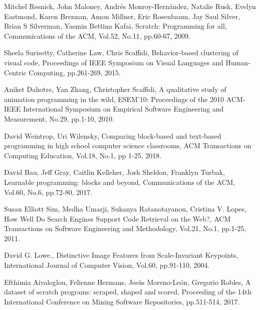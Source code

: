 \documentclass[11pt]{jreport}
\begin{document}

\begin{thebibliography}{99}

Mitchel Resnick, John Maloney, Andr\'{e}s Monroy-Hern\'{a}ndez, Natalie Rusk, Evelyn Eastmond, Karen Brennan, 
Amon Millner, Eric Rosenbaum, Jay Saul Silver, Brian S Silverman, Yasmin Bettina Kafai,
Scratch: Programming for all,
Communications of the ACM, Vol.52, No.11, pp.60-67, 2009.

Sheela Surisetty, Catherine Law, Chris Scaffidi, 
Behavior-based clustering of visual code,
Proceedings of IEEE Symposium on Visual Languages and Human-Centric Computing, pp.261-269, 2015.

Aniket Dahotre, Yan Zhang, Christopher Scaffidi,
A qualitative study of animation programming in the wild,
ESEM'10: Proceedings of the 2010 ACM-IEEE International Symposium on Empirical Software Engineering and Measurement,
No.29, pp.1-10, 2010.
    
David Weintrop, Uri Wilensky,
Comparing block-based and text-based programming in high school computer science classrooms,
ACM Transactions on Computing Education, Vol.18, No.1, pp 1-25, 2018.
    
David Bau, Jeff Gray, Caitlin Kelleher, Josh Sheldon, Franklyn Turbak,
Learnable programming: blocks and beyond,
Communications of the ACM, Vol.60, No.6, pp.72-80, 2017. 

Susan Elliott Sim, Medha Umarji, Sukanya Ratanotayanon, Cristina V. Lopes,
How Well Do Search Engines Support Code Retrieval on the Web?,
ACM Transactions on Software Engineering and Methodology, Vol.21, No.1, pp.1-25, 2011.

David G. Lowe.,
Distinctive Image Features from Scale-Invariant Keypoints,
International Journal of Computer Vision, Vol.60, pp.91-110, 2004.

Efthimia Aivaloglou, Felienne Hermans, Jes\'{u}s Moreno-Le\'{o}n, Gregorio Robles,
A dataset of scratch programs: scraped, shaped and scored,
Proceeding of the 14th International Conference on Mining Software Repositories, pp.511-514, 2017.
　
\end{thebibliography}
\end{document}
